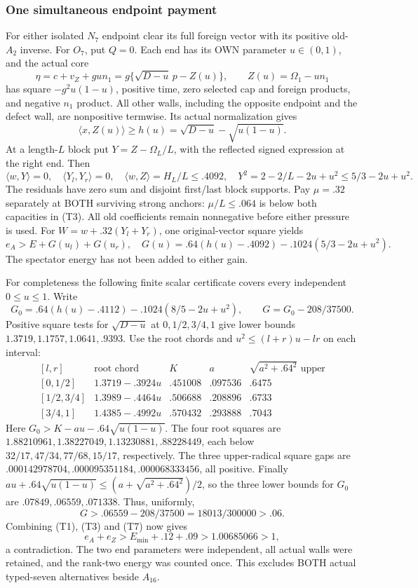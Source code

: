 \documentclass[11pt]{article}
\theoremstyle{definition}
\theoremstyle{remark}
\newcommand{\ip}[2]{\langle #1,#2\rangle}
\begin{document}
\subsubsection{One simultaneous endpoint payment}
For either isolated \(N_7\) endpoint clear its full foreign vector
with its positive old-\(A_2\) inverse.  For \(O_7\), put \(Q=0\).
Each end has its OWN parameter \(u\in(0,1)\), and the actual core
\[
 \eta=c+v_Z+gu n_1
 =g\{\sqrt{D-u}\,p-Z(u)\},\qquad Z(u)=\Omega_1-u n_1
\]
has square \(-g^2u(1-u)\), positive time, zero selected cap and
foreign products, and negative \(n_1\) product.  All other walls,
including the opposite endpoint and the defect wall, are nonpositive
termwise.  Its actual normalization gives
\[
 \ip x{Z(u)}\ge h(u)=\sqrt{D-u}-\sqrt{u(1-u)}.
\]
At a length-\(L\) block put \(Y=Z-\Omega_L/L\), with the
reflected signed expression at the right end.  Then
\[
 \ip wY=0,\quad \ip{Y_l}{Y_r}=0,\quad
 \ip wZ=H_L/L\le.4092,\quad
 Y^2=2-2/L-2u+u^2\le5/3-2u+u^2.
\]
The residuals have zero sum and disjoint first/last block supports.
Pay \(\mu=.32\) separately at BOTH surviving strong anchors:
\(\mu/L\le.064\) is below both capacities in (T3).
All old coefficients remain nonnegative before either pressure is used.
For \(W=w+.32(Y_l+Y_r)\), one original-vector square yields
\[
 e_A>E+G(u_l)+G(u_r),\quad
 G(u)=.64(h(u)-.4092)-.1024(5/3-2u+u^2).            \tag{T7}
\]
The spectator energy has not been added to either gain.

For completeness the following finite scalar certificate covers every
independent \(0\le u\le1\).  Write
\[
 G_0=.64(h(u)-.4112)-.1024(8/5-2u+u^2),\qquad
 G=G_0-208/37500.
\]
Positive square tests for \(\sqrt{D-u}\) at \(0,1/2,3/4,1\)
give lower bounds \(1.3719,1.1757,1.0641,.9393\).
Use the root chords and \(u^2\le(l+r)u-lr\) on each interval:
\[
\begin{array}{c|c|c|c|c}
{}[l,r]&\text{root chord}&K&a&\sqrt{a^2+.64^2}\text{ upper}\\ \hline
{}[0,1/2]&1.3719-.3924u&.451008&.097536&.6475\\
{}[1/2,3/4]&1.3989-.4464u&.506688&.208896&.6733\\
{}[3/4,1]&1.4385-.4992u&.570432&.293888&.7043
\end{array}
\]
Here \(G_0>K-au-.64\sqrt{u(1-u)}\).
The four root squares are
\(1.88210961,1.38227049,1.13230881,.88228449\),
each below \(32/17,47/34,77/68,15/17\), respectively.
The three upper-radical square gaps are
\(.000142978704,.000095351184,.000068333456\), all positive.
Finally
\(au+.64\sqrt{u(1-u)}\le(a+\sqrt{a^2+.64^2})/2\),
so the three lower bounds for \(G_0\) are
\(.07849,.06559,.071338\).  Thus, uniformly,
\[
               G>.06559-208/37500=18013/300000>.06.
\]
Combining (T1), (T3) and (T7) now gives
\[
 e_A+e_Z>E_{\min}+.12+.09>1.00685066>1,
\]
a contradiction.  The two end parameters were independent, all actual
walls were retained, and the rank-two energy was counted once.
This excludes BOTH actual typed-seven alternatives beside \(A_{16}\).
\end{document}
